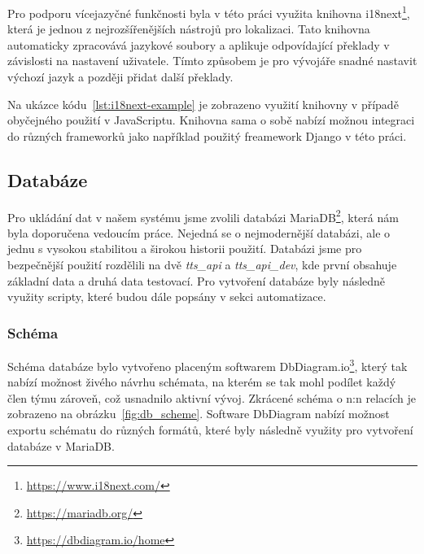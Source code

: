Pro podporu vícejazyčné funkčnosti byla v této práci využita knihovna i18next\footnote{\href{https://www.i18next.com/}{https://www.i18next.com/}}, která je jednou z nejrozšířenějších nástrojů pro lokalizaci. Tato knihovna automaticky zpracovává jazykové soubory a aplikuje odpovídající překlady v závislosti na nastavení uživatele. Tímto způsobem je pro vývojáře snadné nastavit výchozí jazyk a později přidat další překlady.



Na ukázce kódu~\ref{lst:i18next-example} je zobrazeno využití knihovny v případě obyčejného použití v JavaScriptu. Knihovna sama o sobě nabízí možnou integraci do různých frameworků jako například použitý freamework Django v této práci.

\subsection{Databáze}
\label{subsec:implementation-technologies-database}
Pro ukládání dat v našem systému jsme zvolili databázi MariaDB\footnote{\href{https://mariadb.org/}{https://mariadb.org/}}, která nám byla doporučena vedoucím práce. Nejedná se o nejmodernější databázi, ale o jednu s vysokou stabilitou a širokou historii použití. Databázi jsme pro bezpečnější použití rozdělili na dvě \textit{tts\_api} a \textit{tts\_api\_dev}, kde první obsahuje základní data a druhá data testovací. Pro vytvoření databáze byly následně využity scripty, které budou dále popsány v sekci automatizace.

\subsubsection*{Schéma}
\label{subsubsec:implementation-technologies-database-scheme}
Schéma databáze bylo vytvořeno placeným softwarem DbDiagram.io\footnote{\href{https://dbdiagram.io/home}{https://dbdiagram.io/home}}, který tak nabízí možnost živého návrhu schémata, na kterém se tak mohl podílet každý člen týmu zároveň, což usnadnilo aktivní vývoj. Zkrácené schéma o n:n relacích je zobrazeno na obrázku~\ref{fig:db_scheme}. Software DbDiagram nabízí možnost exportu schématu do různých formátů, které byly následně využity pro vytvoření databáze v MariaDB\@.

